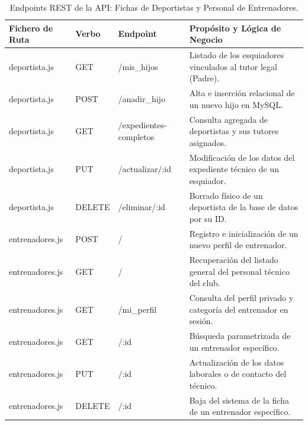         \begin{table}[htbp]
        \centering
        \footnotesize
        \renewcommand{\arraystretch}{1.1}
        \begin{tabularx}{\textwidth}{|l|l|l|X|}
        \hline
        \rowcolor[HTML]{EFEFEF} 
        \textbf{Fichero de Ruta} & \textbf{Verbo} & \textbf{Endpoint} & \textbf{Propósito y Lógica de Negocio} \\ \hline
        deportista.js & GET & /mis\_hijos & Listado de los esquiadores vinculados al tutor legal (Padre). \\ \hline
        deportista.js & POST & /anadir\_hijo & Alta e inserción relacional de un nuevo hijo en MySQL. \\ \hline
        deportista.js & GET & /expedientes-completos & Consulta agregada de deportistas y sus tutores asignados. \\ \hline
        deportista.js & PUT & /actualizar/:id & Modificación de los datos del expediente técnico de un esquiador. \\ \hline
        deportista.js & DELETE & /eliminar/:id & Borrado físico de un deportista de la base de datos por su ID. \\ \hline
        entrenadores.js & POST & / & Registro e inicialización de un nuevo perfil de entrenador. \\ \hline
        entrenadores.js & GET & / & Recuperación del listado general del personal técnico del club. \\ \hline
        entrenadores.js & GET & /mi\_perfil & Consulta del perfil privado y categoría del entrenador en sesión. \\ \hline
        entrenadores.js & GET & /:id & Búsqueda parametrizada de un entrenador específico. \\ \hline
        entrenadores.js & PUT & /:id & Actualización de los datos laborales o de contacto del técnico. \\ \hline
        entrenadores.js & DELETE & /:id & Baja del sistema de la ficha de un entrenador específico. \\ \hline
        \end{tabularx}
        \caption{Endpoints REST de la API: Fichas de Deportistas y Personal de Entrenadores.}
        \label{tab:endpoints_backend_2}
        \end{table}

